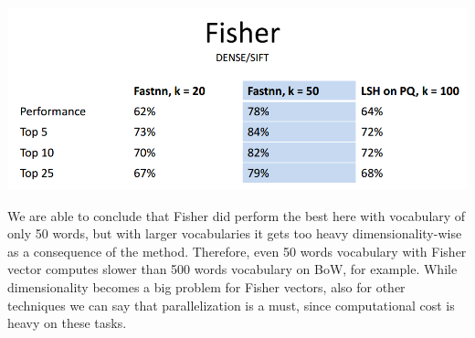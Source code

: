\centerline{\includegraphics[scale = 0.5]{figures/fish.png}}

\par We are able to conclude that Fisher did perform the best here with vocabulary of only 50 words, but with larger vocabularies it gets too heavy dimensionality-wise as a consequence of the method. Therefore, even 50 words vocabulary with Fisher vector computes slower than 500 words vocabulary on BoW, for example. While dimensionality becomes a big problem for Fisher vectors, also for other techniques we can say that parallelization is a must, since computational cost is heavy on these tasks.
